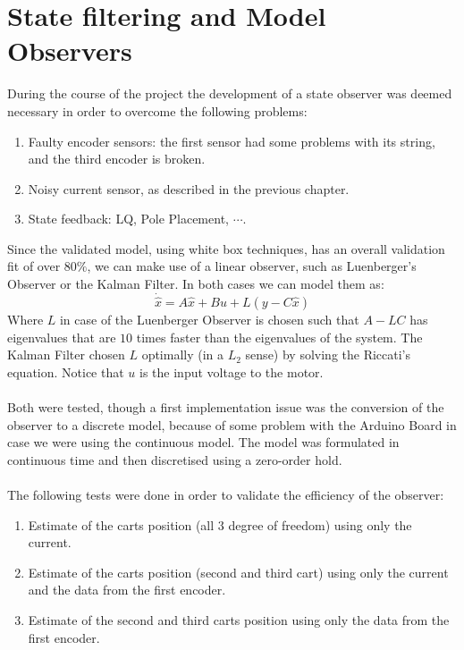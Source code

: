 {\let\clearpage\relax \chapter{State filtering and Model Observers}}
\label{kalmanfilt}
During the course of the project the development of a state observer was deemed necessary in order to overcome the following problems:
\begin{enumerate}
\item Faulty encoder sensors: the first sensor had some problems with  its string, and the third encoder is broken.
\item Noisy current sensor, as described in the previous chapter.
\item State feedback: LQ, Pole Placement, $\cdots$.
\end{enumerate}
Since the validated model, using white box techniques, has an overall validation fit of over $80\%$, we can make use of a linear observer, such as Luenberger's Observer or the Kalman Filter. In both cases we can model them as:
\begin{equation}
\dot{\hat{x}} = A \hat{x}+Bu + L(y-C\hat{x})
\end{equation}
Where $L$ in case of the Luenberger Observer is chosen such that $A-LC$ has eigenvalues that are $10$ times faster than the eigenvalues of the system. The Kalman Filter chosen $L$ optimally (in a $L_2$ sense) by solving the Riccati's equation. Notice that $u$ is the input voltage to the motor.\\\\
Both were tested, though a first implementation issue was the conversion of the observer to a discrete model, because of some problem with the Arduino Board in case we were using the continuous model. The model was formulated in continuous time and then discretised using a zero-order hold.\\ \\
The following tests were done in order to validate the efficiency of the observer:
\begin{enumerate}
\item Estimate of the carts position (all 3 degree of freedom) using only the current.
\item Estimate of the carts position (second and third cart) using only the current and the data from the first encoder.
\item Estimate of the second and third carts position using only the data from the first encoder. 
\end{enumerate}
